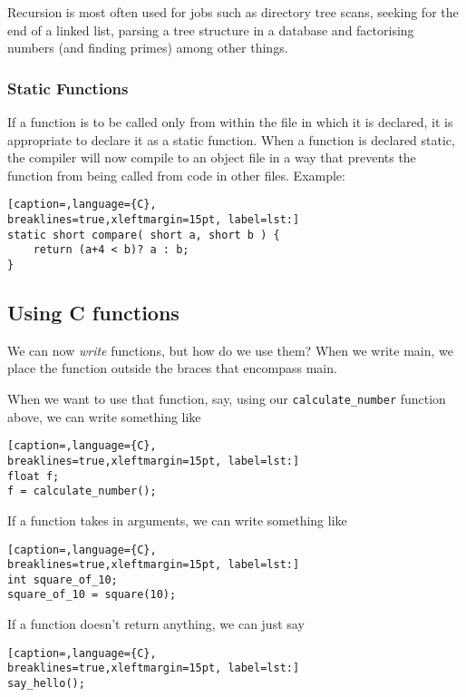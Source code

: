 Recursion is most often used for jobs such as directory tree scans, seeking for
the end of a linked list, parsing a tree structure in a database and
factorising numbers (and finding primes) among other things.

\subsubsection{Static Functions}
If a function is to be called only from within the file in which it is
declared, it is appropriate to declare it as a static function. When a function
is declared static, the compiler will now compile to an object file in a way
that prevents the function from being called from code in other files. Example:
\lstset{basicstyle=\scriptsize, numbers=left, captionpos=b, tabsize=4}
\begin{lstlisting}[caption=,language={C},
breaklines=true,xleftmargin=15pt, label=lst:]
static short compare( short a, short b ) {
	return (a+4 < b)? a : b;
}
\end{lstlisting}

\subsection{Using C functions}
We can now \emph{write} functions, but how do we use them? When we write main,
we place the function outside the braces that encompass main.

When we want to use that function, say, using our \texttt{calculate\_number}
function above, we can write something like
\lstset{basicstyle=\scriptsize, numbers=left, captionpos=b, tabsize=4}
\begin{lstlisting}[caption=,language={C},
breaklines=true,xleftmargin=15pt, label=lst:]
float f;
f = calculate_number();
\end{lstlisting}

If a function takes in arguments, we can write something like
\lstset{basicstyle=\scriptsize, numbers=left, captionpos=b, tabsize=4}
\begin{lstlisting}[caption=,language={C},
breaklines=true,xleftmargin=15pt, label=lst:]
int square_of_10;
square_of_10 = square(10);
\end{lstlisting}

If a function doesn't return anything, we can just say
\lstset{basicstyle=\scriptsize, numbers=left, captionpos=b, tabsize=4}
\begin{lstlisting}[caption=,language={C},
breaklines=true,xleftmargin=15pt, label=lst:]
say_hello();
\end{lstlisting}

